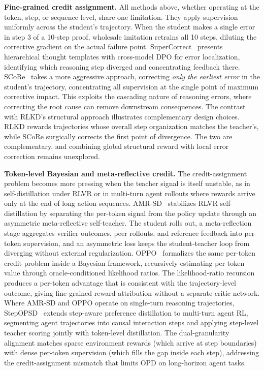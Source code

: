 \documentclass{article} %
\begin{document}
\textbf{Fine-grained credit assignment.} All methods above, whether operating at the token, step, or sequence level, share one limitation. They apply supervision uniformly across the student's trajectory. When the student makes a single error in step 3 of a 10-step proof, wholesale imitation retrains all 10 steps, diluting the corrective gradient on the actual failure point. SuperCorrect~\citep{2410.09008} presents hierarchical thought templates with cross-model DPO for error localization, identifying which reasoning step diverged and concentrating feedback there. SCoRe~\citep{2509.14257} takes a more aggressive approach, correcting \emph{only the earliest error} in the student's trajectory, concentrating all supervision at the single point of maximum corrective impact. This exploits the cascading nature of reasoning errors, where correcting the root cause can remove downstream consequences. The contrast with RLKD's structural approach illustrates complementary design choices. RLKD rewards trajectories whose overall step organization matches the teacher's, while SCoRe surgically corrects the first point of divergence. The two are complementary, and combining global structural reward with local error correction remains unexplored.

\textbf{Token-level Bayesian and meta-reflective credit.} The credit-assignment problem becomes more pressing when the teacher signal is itself unstable, as in self-distillation under RLVR or in multi-turn agent rollouts where rewards arrive only at the end of long action sequences. AMR-SD~\citep{2605.18529} stabilizes RLVR self-distillation by separating the per-token signal from the policy update through an asymmetric meta-reflective self-teacher. The student rolls out, a meta-reflection stage aggregates verifier outcomes, peer rollouts, and reference feedback into per-token supervision, and an asymmetric loss keeps the student-teacher loop from diverging without external regularization. OPPO~\citep{2605.21851} formalizes the same per-token credit problem inside a Bayesian framework, recursively estimating per-token value through oracle-conditioned likelihood ratios. The likelihood-ratio recursion produces a per-token advantage that is consistent with the trajectory-level outcome, giving fine-grained reward attribution without a separate critic network. Where AMR-SD and OPPO operate on single-turn reasoning trajectories, StepOPSD~\citep{2605.27140} extends step-aware preference distillation to multi-turn agent RL, segmenting agent trajectories into causal interaction steps and applying step-level teacher scoring jointly with token-level distillation. The dual-granularity alignment matches sparse environment rewards (which arrive at step boundaries) with dense per-token supervision (which fills the gap inside each step), addressing the credit-assignment mismatch that limits OPD on long-horizon agent tasks.
\end{document}
